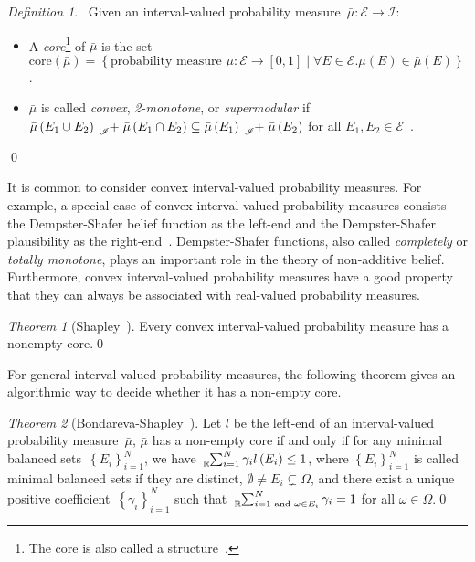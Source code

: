 \documentclass{article}
\theoremstyle{remark}
\newtheorem{definition}{Definition}
\newtheorem{thm}{Theorem}
\newcommand{\events}{\ensuremath{\mathcal{E}}}
\newcommand{\pmeas}{\ensuremath{\mu}}
\begin{document}
\begin{definition}~Given an interval-valued probability measure~$\bar{\mu}:\events\rightarrow\mathscr{I}$:
\begin{itemize}
\item A \emph{core}\footnote{The core is also called a structure~\cite{Weichselberger2000}.}
of $\bar{\mu}$ is the set $\mathrm{core}\left(\bar{\mu}\right)=\left\{ \textrm{probability measure }\pmeas:\events\rightarrow[0,1]\middle|\forall E\in\events.\pmeas\left(E\right)\in\bar{\mu}\left(E\right)\right\} $
\cite{GilboaSchmeidler1994,Marinacci1999,Teran2014}.
\item $\bar{\mu}$ is called \emph{convex}, \emph{2-monotone}, or\emph{
supermodular} if $\bar{\mu}\left(E_{1}\cup E_{2}\right)\tensor*[_{\mathscr{I}}]{+}{}\bar{\mu}\left(E_{1}\cap E_{2}\right)\subseteq\bar{\mu}\left(E_{1}\right)\tensor*[_{\mathscr{I}}]{+}{}\bar{\mu}\left(E_{2}\right)$
for all $E_{1},E_{2}\in\events$~\cite{Shapley1965,GilboaSchmeidler1994,Marinacci1999,Teran2014,Grabisch2016}.
\end{itemize}
\qed\end{definition}

It is common to consider convex interval-valued probability measures.
For example, a special case of convex interval-valued probability
measures consists the Dempster-Shafer belief function as the left-end
and the Dempster-Shafer plausibility as the right-end~\cite{Dempster1967,Shafer1976,GilboaSchmeidler1994,Marinacci1999,Goodman2013,Teran2014}.
Dempster-Shafer functions, also called \emph{completely} or \emph{totally
monotone}, plays an important role in the theory of non-additive belief.
Furthermore, convex interval-valued probability measures have a good
property that they can always be associated with real-valued probability
measures.

\begin{thm}[Shapley~\cite{Shapley1965,GilboaSchmeidler1994}]\label{thm:Shapley}
Every convex interval-valued probability measure has a nonempty core.\qed\end{thm}

For general interval-valued probability measures, the following theorem
gives an algorithmic way to decide whether it has a non-empty core. 

\begin{thm}[Bondareva-Shapley~\cite{Shapley1967,Bondareva1968,Grabisch2016}]\label{thm:Bondareva-Shapley}
Let $l$ be the left-end of an interval-valued probability measure~$\bar{\mu}$,
$\bar{\mu}$ has a non-empty core if and only if for any minimal balanced
sets~$\left\{ E_{i}\right\} _{i=1}^{N}$, we have $\tensor*[_{\mathbb{R}}]{\sum}{_{i=1}^{N}}\gamma_{i}l\left(E_{i}\right)\le1$,
where $\left\{ E_{i}\right\} _{i=1}^{N}$ is called minimal balanced
sets if they are distinct, $\emptyset\ne E_{i}\subsetneq\Omega$,
and there exist a unique positive coefficient~$\left\{ \gamma_{i}\right\} _{i=1}^{N}$
such that $\tensor*[_{\mathbb{R}}]{\sum}{_{i=1\textrm{ and }\omega\in E_{i}}^{N}}\gamma_{i}=1$
for all $\omega\in\Omega$.\qed\end{thm}
\end{document}
